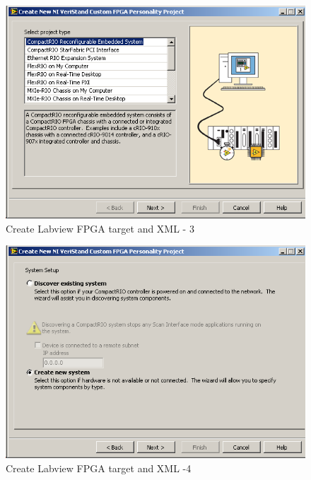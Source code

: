 \begin{figure}[htb!]
	\centering \includegraphics[scale=0.45]{Screenshots/Screenshot_2015-01-16_19-23-41.png}
	\caption{Create Labview FPGA target and XML - 3}
	\label{fig: Create Labview FPGA target and XML-3} 
\end{figure}
\begin{figure}[htb!]
	\centering \includegraphics[scale=0.45]{Screenshots/Screenshot_2015-01-16_19-23-58.png}
	\caption{Create Labview FPGA target and XML -4}
	\label{fig: Create Labview FPGA target and XML-4} 
\end{figure}
